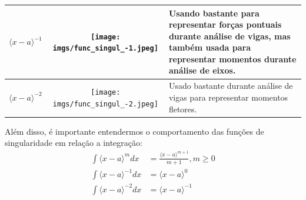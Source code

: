 \documentclass{article}
\begin{document}
\begin{table}[h]
\begin{tabular}{|c|c|l|}
        $\langle x - a\rangle^{-1}$                                    &
        \begin{minipage}{.3\textwidth}
            \centering
            \texttt{[image: imgs/func\_singul\_-1.jpeg]}
        \end{minipage} &
        \begin{minipage}{.4\textwidth}
            Usando bastante para representar forças pontuais durante análise de vigas, mas também usada para representar momentos durante análise de eixos.
        \end{minipage}                     \\ \hline

        $\langle x - a\rangle^{-2}$                                    &
        \begin{minipage}{.3\textwidth}
            \centering
            \texttt{[image: imgs/func\_singul\_-2.jpeg]}
        \end{minipage} &
        \begin{minipage}{.4\textwidth}
            Usado bastante durante análise de vigas para representar momentos fletores.
        \end{minipage}                                                                                         \\ \hline
    \end{tabular}
\end{table}

Além disso, é importante entendermos o comportamento das funções de singularidade em relação a integração:
\begin{align*}
    \int \langle x-a\rangle^m dx    & = \frac{\langle x - a \rangle ^{m+1}}{m + 1}, m \ge 0 \\
    \int \langle x-a\rangle^{-1} dx & = \langle x - a \rangle^0                             \\
    \int \langle x-a\rangle^{-2} dx & = \langle x - a \rangle^{-1}                          \\
\end{align*}
\end{document}
